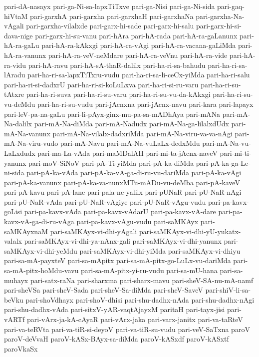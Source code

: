 {pari-dA-nasayx
pari-ga-Ni-sa-lapxTiTxve
pari-ga-Nisi
pari-ga-Ni-sida
pari-gaq-hiVtaM
pari-garxhA
pari-garxha
pari-garxhaH
pari-garxhaNa
pari-garxha-Na-vAgali
pari-garxha-vilalxde
pari-garx-hi-sade
pari-garx-hi-salu
pari-garx-hi-si-dava-nige
pari-garx-hi-su-vanu
pari-hAra
pari-hA-rada
pari-hA-ra-gaLanunx
pari-hA-ra-gaLu
pari-hA-ra-kAkxgi
pari-hA-ra-vAgi
pari-hA-ra-vacana-gaLiMda
pari-hA-ra-vanunx
pari-hA-ra-veV-neMdare
pari-hA-ra-veVnu
pari-hA-ra-vide
pari-hA-ra-vidu
pari-hA-ravu
pari-hA-sA-thaR-dalilx
pari-ha-ri-sa-bahudu
pari-ha-ri-sa-lAradu
pari-ha-ri-sa-lapxTiTxru-vudu
pari-ha-ri-sa-li-ceCx-yiMda
pari-ha-ri-salu
pari-ha-ri-si-dadxrU
pari-ha-ri-si-koLuLxva
pari-ha-ri-si-ru-varu
pari-ha-ri-su-tAtxre
pari-ha-ri-suva
pari-ha-ri-su-varu
pari-ha-ri-su-vu-da-kAkxgi
pari-ha-ri-su-vu-deMdu
pari-ha-ri-su-vudu
pari-jAcnxna
pari-jAcnx-navu
pari-kara
pari-lapayx
pari-leV-pa-na-gaLu
pari-li-pAyx-ginx-mu-pa-sa-mADhAya
pari-mANa
pari-mA-Na-dalilx
pari-mA-Na-diMda
pari-mA-Nadudx
pari-mA-Na-ga-lilalxdUdx
pari-mA-Na-vanunx
pari-mA-Na-vilalx-dadxriMda
pari-mA-Na-viru-va-va-nAgi
pari-mA-Na-viru-vudo
pari-mA-Navu
pari-mA-Na-vuLaLx-dedxMdu
pari-mA-Na-vu-LaLxdudx
pari-ma-La-vAda
pari-maMDalAH
pari-mi-ta-jAcnx-naveV
pari-mi-ti-yanunx
pari-moV-SiNoV
pari-pA-Ti-yiMda
pari-pA-ka-diMda
pari-pA-ka-ga-Le-ni-sida
pari-pA-ka-vAda
pari-pA-ka-vA-ga-di-ru-vu-dariMda
pari-pA-ka-vAgi
pari-pA-ka-vanunx
pari-pA-ka-va-nunxMTu-mADu-vu-deMba
pari-pA-kaveV
pari-pA-kavu
pari-pA-lane
pari-pala-ne-yalilx
pari-pUNaR
pari-pU-NaR-nAgi
pari-pU-NaR-vAda
pari-pU-NaR-vAgiye
pari-pU-NaR-vAgu-vudu
pari-pa-kavx-goLisi
pari-pa-kavx-vAda
pari-pa-kavx-vAdarU
pari-pa-kavx-vA-dare
pari-pa-kavx-vA-ga-di-ru-vAga
pari-pa-kavx-vAgu-vudu
pari-saMKAyx
pari-saMKAyxnaM
pari-saMKAyx-vi-dhi-yAgali
pari-saMKAyx-vi-dhi-yU-yukatx-valalx
pari-saMKAyx-vi-dhi-ya-nAnx-gali
pari-saMKAyx-vi-dhi-yanunx
pari-saMKAyx-vi-dhi-yeMdu
pari-saMKAyx-vi-dhi-yiMda
pari-saMKAyx-vi-dhiyu
pari-sa-mA-payxteV
pari-sa-mApitx
pari-sa-mA-pitx-go-LuLx-vu-dariMda
pari-sa-mA-pitx-hoMdu-vavu
pari-sa-mA-pitx-yi-ru-vudu
pari-sa-mU-hana
pari-sa-muhayx
pari-satx-raNa
pari-sharxma
pari-sharx-mavu
pari-sheV-SA-nu-mA-namf
pari-sheVSa
pari-sheV-Sada
pari-sheV-Sa-diMda
pari-sheV-SaveV
pari-shiV-li-sa-beVku
pari-shoVdhayx
pari-shoV-dhisi
pari-shu-dadhx-nAda
pari-shu-dadhx-nAgi
pari-shu-dadhx-vAda
pari-sitxV-yAR-vaqtAjayxM
paritaH
pari-tayx-jisi
pari-vARTf
pari-vArx-ja-kA-cAyaR
pari-vArx-jaka
pari-varx-janitx
pari-va-taRteV
pari-va-teRVta
pari-va-tiR-si-deyoV
pari-va-tiR-su-vudu
pari-veV-SaTxna
paroV
paroV-deVvaH
paroV-kASx-BAyx-sa-diMda
paroV-kASxdf
paroV-kASxtf
paroVkaSx
}
